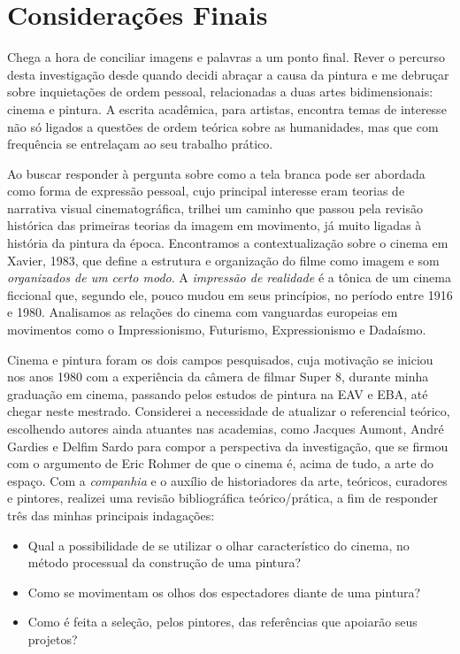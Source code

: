 \chapter{Considerações Finais}%
\label{consideracoes}

Chega a hora de conciliar imagens e palavras a um ponto final. Rever o
percurso desta investigação desde quando decidi abraçar a causa da
pintura e me debruçar sobre inquietações de ordem pessoal, relacionadas
a duas artes bidimensionais: cinema e pintura. A escrita acadêmica,
para artistas, encontra temas de interesse não só ligados a questões de
ordem teórica sobre as humanidades, mas que com frequência se
entrelaçam ao seu trabalho prático.

Ao buscar responder à pergunta sobre como a tela branca pode ser
abordada como forma de expressão pessoal, cujo principal interesse eram
teorias de narrativa visual cinematográfica, trilhei um caminho que
passou pela revisão histórica das primeiras teorias da imagem em
movimento, já muito ligadas à história da pintura da época. Encontramos
a contextualização sobre o cinema em Xavier, 1983, que define a
estrutura e organização do filme como imagem e som \emph{organizados de
	um certo modo}. A \emph{impressão de realidade} é a tônica de um cinema
ficcional que, segundo ele, pouco mudou em seus princípios, no período
entre 1916 e 1980. Analisamos as relações do cinema com vanguardas
europeias em movimentos como o Impressionismo, Futurismo,
Expressionismo e Dadaísmo.

Cinema e pintura foram os dois campos pesquisados, cuja motivação se
iniciou nos anos 1980 com a experiência da câmera de filmar Super 8,
durante minha graduação em cinema, passando pelos estudos de pintura na
EAV e EBA, até chegar neste mestrado. Considerei a necessidade de
atualizar o referencial teórico, escolhendo autores ainda atuantes nas
academias, como Jacques Aumont, André Gardies e Delfim Sardo para
compor a perspectiva da investigação, que se firmou com o argumento de
Eric Rohmer de que o cinema é, acima de tudo, a arte do espaço. Com a
\emph{companhia} e o auxílio de historiadores da arte, teóricos,
curadores e pintores, realizei uma revisão bibliográfica
teórico/prática, a fim de responder três das minhas principais
indagações:

\begin{itemize}
	\item Qual a possibilidade de se utilizar o olhar característico do cinema,
	      no método processual da construção de uma pintura?

	\item Como se movimentam os olhos dos espectadores diante de uma pintura?

	\item Como é feita a seleção, pelos pintores, das referências que apoiarão
	      seus projetos?
\end{itemize}

